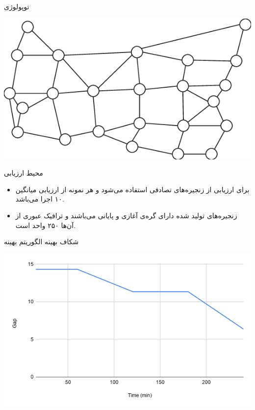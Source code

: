 \documentclass{beamer}
\makeatletter
\newcommand{\RTList}{\raggedleft\rightskip\@totalleftmargin}
\makeatother
\begin{document}
\begin{persian}
\begin{frame}{توپولوژی }
\begin{center}
        \includegraphics[scale=0.4]{images/usnet.png}
    \end{center}
\end{frame}
\begin{frame}{محیط ارزیابی}
    \begin{itemize}\RTList{}
        \item برای ارزیابی از زنجیره‌های تصادفی استفاده می‌شود و هر نمونه از ارزیابی میانگین ۱۰ اجرا می‌باشد.
        \item 
        زنجیره‌های تولید شده دارای گره‌ی آغازی و پایانی می‌باشند
        و ترافیک عبوری از آن‌ها ۲۵۰ واحد است.
    \end{itemize}
\end{frame}
\begin{frame}{شکاف بهینه الگوریتم بهینه}
    \begin{center}
        \includegraphics[scale=0.5]{images/chart-5.png}
    \end{center}

\end{frame}
\end{persian}
\end{document}
